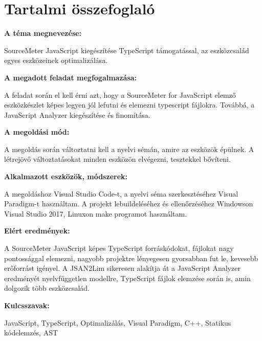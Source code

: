 \chapter*{Tartalmi összefoglaló}

\noindent\textbf{A téma megnevezése:}

SourceMeter JavaScript kiegészítése TypeScript támogatással, az eszközcsalád egyes eszközeinek optimalizálása.

\noindent\textbf{A megadott feladat megfogalmazása:}

A feladat során el kell érni azt, hogy a SourceMeter for JavaScript elemző eszközkészlet képes legyen jól lefutni és elemezni typescript fájlokra.
Továbbá, a JavaScript Analyzer kiegészítése és finomítása.

\noindent\textbf{A megoldási mód:}

A megoldás során változtatni kell a nyelvi sémán, amire az eszközök épülnek. A létrejövő változtatásokat minden eszközön elvégezni, tesztekkel bővíteni.

\noindent\textbf{Alkalmazott eszközök, módszerek:}

A megoldáshoz Visual Studio Code-t, a nyelvi séma szerkesztéséhez Visual Paradigm-t használtam.
A projekt lebuildeléséhez és ellenőrzéséhez Windowson Visual Studio 2017, Linuxon make programot használtam.

\noindent\textbf{Elért eredmények:}

A SourceMeter JavaScript képes TypeScript forráskódokat, fájlokat nagy pontossággal elemezni, nagyobb projektre lényegesen gyorsabban fut le, kevesebb erőforrást igényel.
A JSAN2Lim sikeresen alakítja át a JavaScript Analyzer eredményét nyelvfüggetlen modellre, TypeScript fájlok elemzése során is, amin dolgozik több eszközcsalád.

\noindent\textbf{Kulcsszavak:}

JavaScript, TypeScript, Optimalizálás, Visual Paradigm, C++, Statikus kódelemzés, AST
